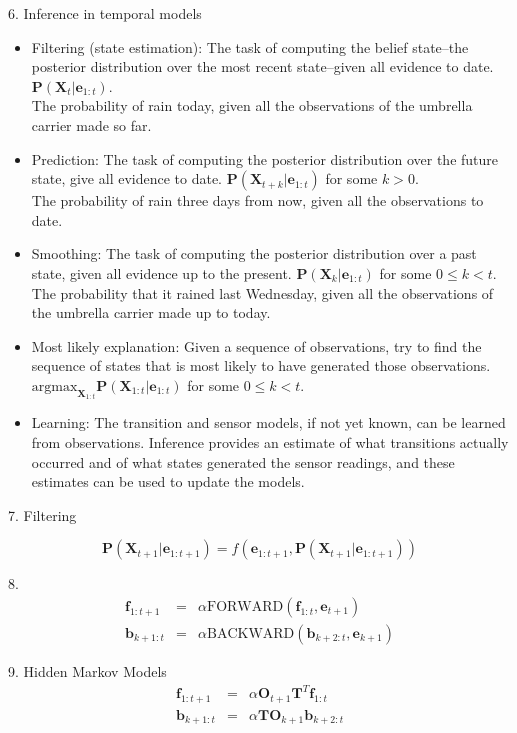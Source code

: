 \documentclass[12pt]{article}
\begin{document}
6. Inference in temporal models
\begin{itemize}
\item Filtering (state estimation): The task of computing the belief state--the posterior distribution over the most recent state--given all evidence to date. $\boldsymbol{P}(\boldsymbol{X}_t | \boldsymbol{e}_{1:t})$. \\
The probability of rain today, given all the observations of the umbrella carrier made so far.
\item Prediction: The task of computing the posterior distribution over the future state, give all evidence to date. $\boldsymbol{P}(\boldsymbol{X}_{t+k} | \boldsymbol{e}_{1:t})$ for some $k>0$. \\
The probability of rain three days from now, given all the observations to date.
\item Smoothing: The task of computing the posterior distribution over a past state, given all evidence up to the present. $\boldsymbol{P}(\boldsymbol{X}_k | \boldsymbol{e}_{1:t})$ for some $0 \le k < t$. \\
The probability that it rained last Wednesday, given all the observations of the umbrella carrier made up to today.
\item Most likely explanation: Given a sequence of observations, try to find the sequence of states that is most likely to have generated those observations. \\
$\text{argmax}_{\boldsymbol{X}_{1:t}}\boldsymbol{P}(\boldsymbol{X}_{1:t} | \boldsymbol{e}_{1:t})$ for some $0 \le k < t$.
\item Learning: The transition and sensor models, if not yet known, can be learned from observations. Inference provides an estimate of what transitions actually occurred and of what states generated the sensor readings, and these estimates can be used to update the models.
\end{itemize}

7. Filtering

\begin{equation*}
\boldsymbol{P}(\boldsymbol{X}_{t+1} | \boldsymbol{e}_{1:t+1})
= f(\boldsymbol{e}_{1:t+1}, 
    \boldsymbol{P}(\boldsymbol{X}_{t+1} | \boldsymbol{e}_{1:t+1}))
\end{equation*}

8.
\begin{eqnarray*}
\boldsymbol{f}_{1:t+1}
&=& \alpha \text{FORWARD}(\boldsymbol{f}_{1:t}, \boldsymbol{e}_{t+1}) \\
\boldsymbol{b}_{k+1:t}
&=& \alpha \text{BACKWARD}(\boldsymbol{b}_{k+2:t}, \boldsymbol{e}_{k+1})
\end{eqnarray*}

9. Hidden Markov Models
\begin{eqnarray*}
\boldsymbol{f}_{1:t+1}
&=& \alpha \boldsymbol{O}_{t+1} \boldsymbol{T}^T \boldsymbol{f}_{1:t} \\
\boldsymbol{b}_{k+1:t}
&=& \alpha \boldsymbol{T} \boldsymbol{O}_{k+1} \boldsymbol{b}_{k+2:t}
\end{eqnarray*}
\end{document}
